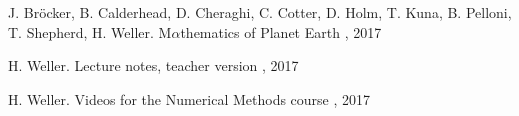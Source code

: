 %
\begin{thebibliography}{99}

J. Br\"{o}cker, B. Calderhead, D. Cheraghi, C. Cotter, D. Holm, T. Kuna, B. Pelloni, T. Shepherd, H. Weller.
\newblock M$\alpha$thematics of Planet Earth
, 2017

H. Weller.
\newblock Lecture notes, teacher version
\newblock {\em }, 2017

H. Weller.
\newblock Videos for the Numerical Methods course
, 2017



\end{thebibliography}
